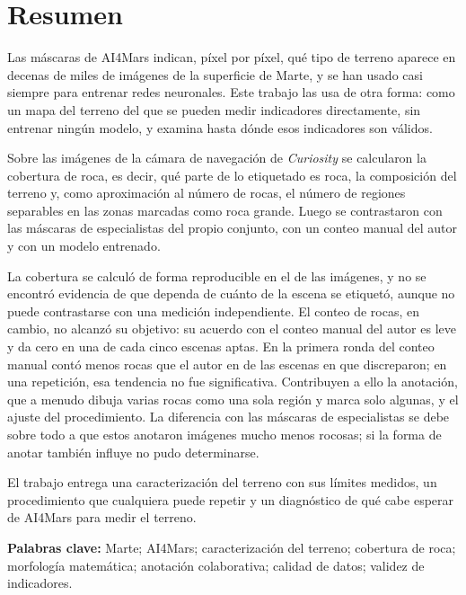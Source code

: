 \chapter*{Resumen}

Las máscaras de AI4Mars indican, píxel por píxel, qué tipo de terreno aparece en decenas de
miles de imágenes de la superficie de Marte, y se han usado casi siempre para entrenar redes
neuronales. Este trabajo las usa de otra forma: como un mapa del terreno del que se pueden
medir indicadores directamente, sin entrenar ningún modelo, y examina hasta dónde esos
indicadores son válidos.

Sobre las \cNEscenas{} imágenes de la cámara de navegación de \textit{Curiosity} se calcularon la
cobertura de roca, es decir, qué parte de lo etiquetado es roca, la composición del terreno y,
como aproximación al número de rocas, el número de regiones separables en las zonas marcadas
como roca grande. Luego se contrastaron con
las máscaras de especialistas del propio conjunto, con un conteo manual del autor y con un
modelo entrenado.

La cobertura se calculó de forma reproducible en el \cPctCobCalc{} de las imágenes, y no se
encontró evidencia de que dependa de cuánto de la escena se etiquetó, aunque no puede
contrastarse con una medición independiente. El conteo de rocas, en cambio, no alcanzó su
objetivo: su acuerdo con el conteo manual del autor es leve y da cero en una de cada cinco
escenas aptas. En la primera ronda del conteo manual contó menos rocas que el autor en \cVAbajo{}
de las \cVDesac{} escenas en que discreparon; en una repetición, esa tendencia no fue
significativa. Contribuyen a ello la anotación, que a menudo dibuja varias rocas como una sola
región y marca solo algunas, y el ajuste del procedimiento. La diferencia con las máscaras de especialistas se debe
sobre todo a que estos anotaron imágenes mucho menos rocosas; si la forma de anotar también
influye no pudo determinarse.

El trabajo entrega una caracterización del terreno con sus límites medidos, un procedimiento
que cualquiera puede repetir y un diagnóstico de qué cabe esperar de AI4Mars para medir el
terreno.

\vspace{0.4cm}
\noindent
\textbf{Palabras clave:} Marte; AI4Mars; caracterización del terreno; cobertura de roca;
morfología matemática; anotación colaborativa; calidad de datos; validez de indicadores.
